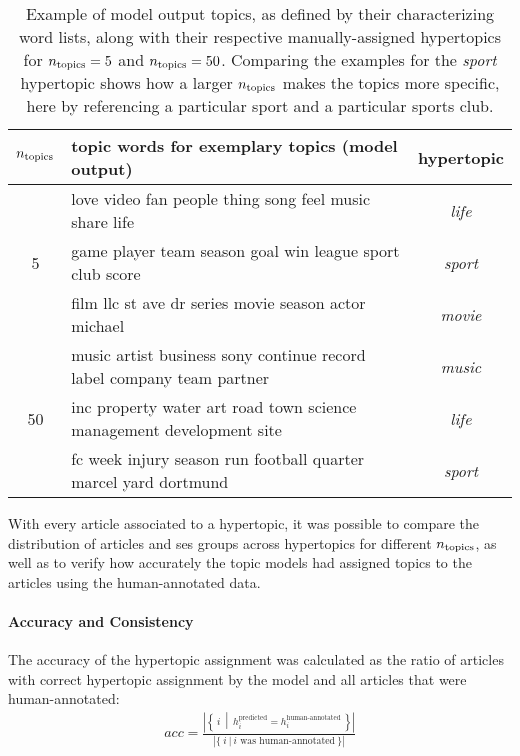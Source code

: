 \begin{table}
    \centering
    \begin{tabular}{clc}
        \toprule
        $n_\text{topics}$ & topic words for exemplary topics (model output) & hypertopic \\
        \toprule 
        \multirow{3}{*}{5} & love video fan people thing song feel music share life & \textit{life}\\
        & game player team season goal win league sport club score & \textit{sport}\\
        & film llc st ave dr series movie season actor michael & \textit{movie}\\
        \midrule
        \multirow{3}{*}{50} & music artist business sony continue record label company team partner & \textit{music} \\
        & inc property water art road town science management development site & \textit{life} \\
        & fc week injury season run football quarter marcel yard dortmund & \textit{sport} \\
        \bottomrule
    \end{tabular}
    \caption{Example of model output topics, as defined by their characterizing word lists, along with their respective manually-assigned hypertopics for $n_\text{topics} = 5$ and $n_\text{topics} = 50$. Comparing the examples for the \textit{sport} hypertopic shows how a larger $n_\text{topics}$ makes the topics more specific, here by referencing a particular sport and a particular sports club.}\label{tab:hypertopics_examples}
\end{table}

With every article associated to a hypertopic, it was possible to compare the distribution of articles and \gls{ses} groups across hypertopics for different $n_\text{topics}$, as well as to verify how accurately the topic models had assigned topics to the articles using the human-annotated data.

\paragraph{Accuracy and Consistency}
The accuracy of the hypertopic assignment was calculated as the ratio of articles with correct hypertopic assignment by the model and all articles that were human-annotated:
\begin{align}\label{eq:accuracy}
    acc = \frac{
        \left|
            \left\{~i~\middle|~h_{i}^\text{predicted} = h_{i}^\text{human-annotated}~\right\}
        \right|
    }{
        \left|
            \{{~i~|~i \text{ was human-annotated}~}\}
        \right|
    }
\end{align}

